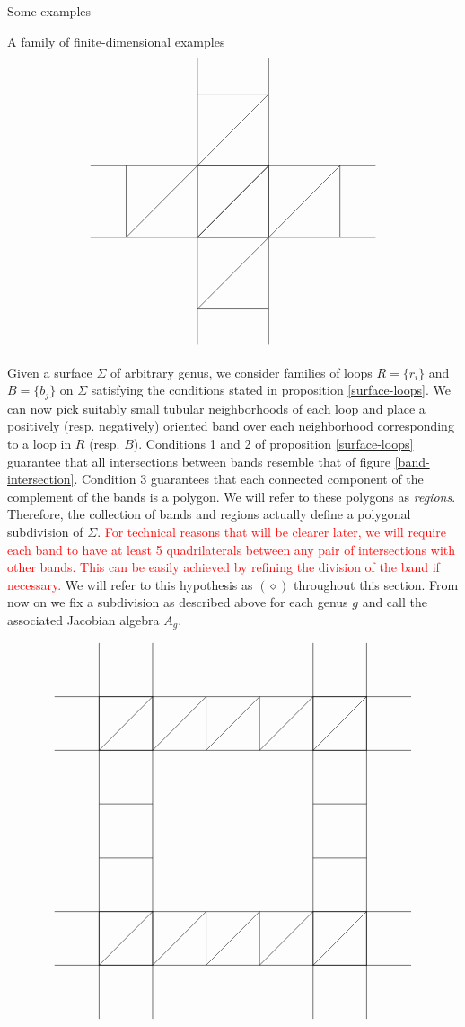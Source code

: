 \begin{chapter}{Some examples}
\begin{section}{A family of finite-dimensional examples}
\[
\label{band-intersection}
\begin{tikzpicture}
\draw (-4,-1) -- (4,-1);
\draw (-4,1) -- (4,1);
\draw (-1,4) -- (-1,-4);
\draw (1,-4) -- (1,4);
\foreach \x in {-3,-1,...,3}
{
\draw (\x,-1) -- (\x, 1);
\draw (-1,\x) -- (1,\x);
}
\foreach \x in {-3,-1,1}
{
\draw (\x,-1) -- (\x+2,1);
\draw (-1,\x) -- (1,\x+2);
}
\end{tikzpicture}
\]

Given a surface $\Sigma$ of arbitrary genus, we consider families of loops $R=\{r_i\}$ and $B=\{b_j\}$ on $\Sigma$ satisfying the conditions stated in proposition \ref{surface-loops}. We can now pick suitably small tubular neighborhoods of each loop and place a positively (resp. negatively) oriented band over each neighborhood corresponding to a loop in $R$ (resp. $B$). Conditions 1 and 2 of proposition \ref{surface-loops} guarantee that all intersections between bands resemble that of figure \ref{band-intersection}. Condition 3 guarantees that each connected component of the complement of the bands is a polygon. We will refer to these polygons as \emph{regions}. Therefore, the collection of bands and regions actually define a polygonal subdivision of $\Sigma$. \textcolor{red}{For technical reasons that will be clearer later, we will require each band to have at least 5 quadrilaterals between any pair of intersections with other bands. This can be easily achieved by refining the division of the band if necessary.} We will refer to this hypothesis as $(\diamond)$ throughout this section. From now on we fix a subdivision as described above for each genus $g$ and call the associated Jacobian algebra $A_g$.

\begin{figure}[h]
\[
\begin{tikzpicture}
\draw (-5, .75) -- (5, .75);
\draw (-5, -.75) -- (5, -.75);
\draw (-5, -5.25) -- (5, -5.25);
\draw (-5, -6.75) -- (5, -6.75);
\draw (-2.25, -8.25) -- (-2.25, 2.25);
\draw (-3.75, -8.25) -- (-3.75, 2.25);
\draw (2.25, -8.25) -- (2.25, 2.25);
\draw (3.75, -8.25) -- (3.75, 2.25);

\foreach \x in {-3.75,-2.25,...,3.75}
{
\draw (\x, .75) -- (\x, -.75);
\draw (\x, -5.25) -- (\x, -6.75);
}

\foreach \x in {-6.75,-5.25,...,1.75}
{
\draw (-3.75, \x) -- (-2.25, \x);
\draw (3.75, \x) -- (2.25, \x);
}

\foreach \x in {-3.75,-2.25,...,2.25}
{
\draw (\x, -.75) -- (\x+1.5, .75);
\draw (\x, -6.75) -- (\x+1.5, -5.25);
}


\end{tikzpicture}\]
\end{figure}
\end{section}
\end{chapter}
